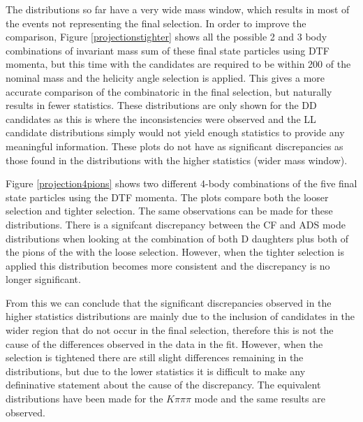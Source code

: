 The distributions so far have a very wide \Kstar mass window, which results in most of the events not representing the final selection. In order to improve the comparison, Figure \ref{projectionstighter} shows all the possible 2 and 3 body combinations of invariant mass sum of these final state particles using DTF momenta, but this time with the \Kstar candidates are required to be within 200 \mev of the nominal mass and the \KS helicity angle selection is applied. This gives a more accurate comparison of the combinatoric in the final selection, but naturally results in fewer statistics. These distributions are only shown for the DD candidates as this is where the inconsistencies were observed and the LL candidate distributions simply would not yield enough statistics to provide any meaningful information. These plots do not have as significant discrepancies as those found in the distributions with the higher statistics (wider \Kstar mass window).

Figure \ref{projection4pions} shows two different 4-body combinations of the five final state particles using the DTF momenta. The plots compare both the looser \Kstar selection and tighter \Kstar selection. The same observations can be made for these distributions. There is a signifcant discrepancy between the CF and ADS mode distributions when looking at the combination of both D daughters plus both of the pions of the \KS with the loose \Kstar selection. However, when the tighter \Kstar selection is applied this distribution becomes more consistent and the discrepancy is no longer significant. 

From this we can conclude that the significant discrepancies observed in the higher statistics distributions are mainly due to the inclusion of candidates in the wider \Kstar region that do not occur in the final selection, therefore this is not the cause of the differences observed in the data in the fit. However, when the \Kstar selection is tightened there are still slight differences remaining in the distributions, but due to the lower statistics it is difficult to make any defininative statement about the cause of the discrepancy. The equivalent distributions have been made for the $K\pi\pi\pi$ mode and the same results are observed.

%

